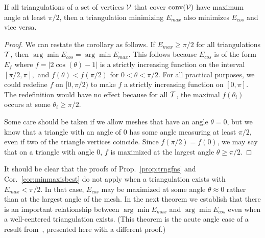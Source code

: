 \documentclass[final]{siamltex}
\DeclareMathOperator{\conv}{conv}
\begin{document}
\bigskip

\begin{corollary}
\label{cor:minmaxisbest}
If all triangulations of a set of vertices $\mathcal{V}$ that cover
$\conv(\meshV)$ have maximum angle at least $\pi/2$, then a
triangulation minimizing $E_{max}$ also minimizes $E_{cos}$ and vice
versa.
\end{corollary}
\begin{proof}
  We can restate the corollary as follows.  If $E_{max} \ge \pi/2$ for
  all triangulations $\mathcal{T}$, then $\arg\min E_{cos} = \arg\min
  E_{max}$.  This follows because $E_{cos}$ is of the form $E_{f}$
  where $f = \left\lvert 2 \cos(\theta) - 1\right\rvert$ is a strictly
  increasing function on the interval $[\pi/2, \pi],$ and $f(\theta) <
  f(\pi/2)$ for $0 < \theta < \pi/2$.  For all practical purposes, we
  could redefine $f$ on $[0, \pi/2)$ to make $f$ a strictly increasing
  function on $[0, \pi]$.  The redefinition would have no effect
  because for all $\mathcal{T}$, the maximal $f(\theta_{i})$ occurs at some
  $\theta_{i} \ge \pi/2$.

  Some care should be taken if we allow meshes that have an angle
  $\theta = 0$, but we know that a triangle with an angle of $0$ has
  some angle measuring at least $\pi/2$, even if two of the triangle
  vertices coincide.  Since $f(\pi/2) = f(0)$, we may say that on a
  triangle with angle $0$, $f$ is maximized at the largest angle
  $\theta \ge \pi/2$.
\end{proof}

\bigskip

It should be clear that the proofs of Prop.~\ref{prop:trngfns} and
Cor.~\ref{cor:minmaxisbest} do not apply when a triangulation exists
with $E_{max} < \pi/2$.  In that case, $E_{cos}$ may be maximized at
some angle $\theta \approx 0$ rather than at the largest angle of the
mesh.  In the next theorem we establish that there is an important
relationship between $\arg\min E_{max}$ and $\arg\min E_{cos}$ even
when a well-centered triangulation exists.  (This theorem
is the acute angle case of a result from~\cite{BeEp1995},
presented here with a different proof.)

\bigskip
\end{document}
